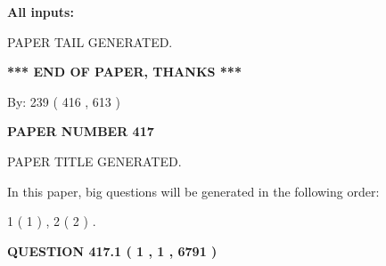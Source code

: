 \documentclass[12pt]{article}
\begin{document}
   
   
   
\noindent{}
   
   
   
   
\noindent\vspace{0.1in}\hspace{-0.08in} {\textbf{\Large{All inputs: }}}
   
   
   
   
   
   
 \vspace{0.2in}
 
   
   
\vspace{2.0in} PAPER TAIL GENERATED.
   
   
   
   
\vspace{1.0in} 
{\textbf{\large{ *** END OF PAPER, THANKS *** }}} 
   
   
\hspace{1.0in} By: 
 239 ( 416 ,  613 )
   
   
   
   
\newpage 
\setcounter{page}{ 
   417001 } 
   
   
   
   
 {\textbf{ \Large{ PAPER NUMBER  417  }}}
   
   
\vspace{0.2in}
   
   
   
   
   
   
   
   
 \vspace{0.2in}
 
 
 
 
   
   
 PAPER TITLE GENERATED.
   
   
   
\vspace{0.2in}
   
In this paper, big questions will be generated in the following order: 
   
   
   1 ( 1 )
 ,
   2 ( 2 )
 .
  
\vspace{0.2in}
  
{\textbf{\Large{QUESTION
417.1 
 ( 1 , 1 , 6791 )
}}}
  
\end{document}
